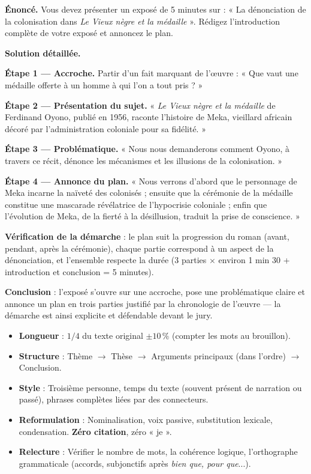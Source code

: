 \documentclass[11pt]{article}
\begin{document}
\begin{exoresolu}
\textbf{Énoncé.} Vous devez présenter un exposé de 5 minutes sur : « La dénonciation de la colonisation dans \emph{Le Vieux nègre et la médaille} ». Rédigez l'introduction complète de votre exposé et annoncez le plan.

\tcblower
\textbf{Solution détaillée.}

\textbf{Étape 1 — Accroche.} Partir d'un fait marquant de l'œuvre : « Que vaut une médaille offerte à un homme à qui l'on a tout pris ? »

\textbf{Étape 2 — Présentation du sujet.} « \emph{Le Vieux nègre et la médaille} de Ferdinand Oyono, publié en 1956, raconte l'histoire de Meka, vieillard africain décoré par l'administration coloniale pour sa fidélité. »

\textbf{Étape 3 — Problématique.} « Nous nous demanderons comment Oyono, à travers ce récit, dénonce les mécanismes et les illusions de la colonisation. »

\textbf{Étape 4 — Annonce du plan.} « Nous verrons d'abord que le personnage de Meka incarne la naïveté des colonisés ; ensuite que la cérémonie de la médaille constitue une mascarade révélatrice de l'hypocrisie coloniale ; enfin que l'évolution de Meka, de la fierté à la désillusion, traduit la prise de conscience. »

\textbf{Vérification de la démarche} : le plan suit la progression du roman (avant, pendant, après la cérémonie), chaque partie correspond à un aspect de la dénonciation, et l'ensemble respecte la durée (3 parties $\times$ environ 1 min 30 + introduction et conclusion = 5 minutes).

\textbf{Conclusion} : l'exposé s'ouvre sur une accroche, pose une problématique claire et annonce un plan en trois parties justifié par la chronologie de l'œuvre — la démarche est ainsi explicite et défendable devant le jury.
\end{exoresolu}

\begin{aretenir}
\begin{itemize}
\item \textbf{Longueur} : $1/4$ du texte original $\pm 10\,\%$ (compter les mots au brouillon).
\item \textbf{Structure} : Thème $\rightarrow$ Thèse $\rightarrow$ Arguments principaux (dans l'ordre) $\rightarrow$ Conclusion.
\item \textbf{Style} : Troisième personne, temps du texte (souvent présent de narration ou passé), phrases complètes liées par des connecteurs.
\item \textbf{Reformulation} : Nominalisation, voix passive, substitution lexicale, condensation. \textbf{Zéro citation}, zéro « je ».
\item \textbf{Relecture} : Vérifier le nombre de mots, la cohérence logique, l'orthographe grammaticale (accords, subjonctifs après \emph{bien que, pour que}...).
\end{itemize}
\end{aretenir}
\end{document}
